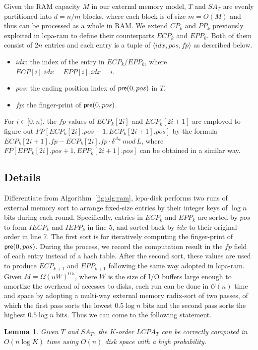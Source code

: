 \documentclass[article]{IEEEtran}
\newtheorem{lem}[thm]{Lemma}
\theoremstyle{definition}
\theoremstyle{remark}
\numberwithin{equation}{section}
\begin{document}
Given the RAM capacity $M$ in our external memory model, $T$ and $SA_T$ are evenly partitioned into $d=n/m$ blocks, where each block is of size $m=O(M)$ and thus can be processed as a whole in RAM. We extend $CP_k$ and $PP_k$ previously exploited in lcpa-ram to define their counterparts $ECP_k$ and $EPP_k$. Both of them consist of $2n$ entries and each entry is a tuple of $\langle idx, pos, fp \rangle$ as described below.
\begin{itemize}
\item $idx$: the index of the entry in $ECP_k/EPP_k$, where $ECP[i].idx=EPP[i].idx=i$.
\item $pos$: the ending position index of ${\sf pre}(0,pos)$ in $T$.
\item $fp$: the finger-print of ${\sf pre}(0,pos)$.
\end{itemize}

For $i\in [0,n)$, the $fp$ values of $ECP_k[2i]$ and $ECP_k[2i+1]$ are employed to figure out $FP[ECP_k[2i].pos+1, ECP_k[2i+1].pos]$ by the formula $ECP_k[2i+1].fp - ECP_k[2i].fp \cdot \delta^{\Delta_k} \, mod \, L$, where $FP[EPP_k[2i].pos+1, EPP_k[2i+1].pos]$ can be obtained in a similar way.

\subsection{Details}
Differentiate from Algorithm~\ref{fig:alg:ram}, lcpa-disk performs two runs of external memory sort to arrange fixed-size entries by their integer keys of $\log n$ bits during each round. Specifically, entries in $ECP_k$ and $EPP_k$ are sorted by $pos$ to form $IECP_k$ and $IEPP_k$ in line 5, and sorted back by $idx$ to their original order in line 7. The first sort is for iteratively computing the finger-print of ${\sf pre}(0,pos)$. During the process, we record the computation result in the $fp$ field of each entry instead of a hash table. After the second sort, these values are used to produce $ECP_{k+1}$ and $EPP_{k+1}$ following the same way adopted in lcpa-ram. Given $M=\Omega(nW)^{0.5}$, where $W$ is the size of {I/O} buffers large enough to amortize the overhead of accesses to disks, each run can be done in $\mathcal{O}(n)$ time and space by adopting a multi-way external memory radix-sort of two passes, of which the first pass sorts the lowest $0.5\log n$ bits and the second pass sorts the highest $0.5\log n$ bits. Thus we can come to the following statement.

\begin{lem}
\label{thm:lcp:em}
Given $T$ and $SA_T$, the $K$-order $LCPA_T$ can be correctly computed in $O(n \log K)$ time using $O(n)$ disk space with a high probability.
\end{lem}
\end{document}
